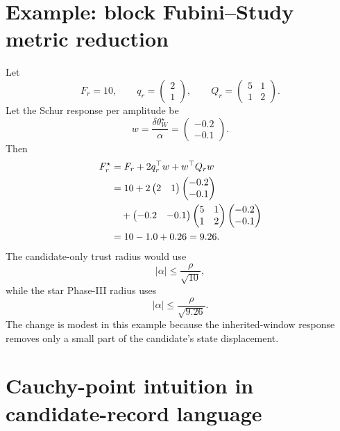 \documentclass[10pt,twocolumn]{article}
\newcommand{\twovec}[2]{\begin{pmatrix}#1\\#2\end{pmatrix}}
\begin{document}
\section{Example: block Fubini--Study metric reduction}

Let
\begin{equation}
F_r=10,\qquad
q_r=\twovec{2}{1},
\qquad
Q_r=
\begin{pmatrix}
5&1\\
1&2
\end{pmatrix}.
\label{eq:block_metric_ex_data}
\end{equation}
Let the Schur response per amplitude be
\begin{equation}
w=\frac{\delta\theta_W^\star}{\alpha}
=\twovec{-0.2}{-0.1}.
\label{eq:block_metric_w}
\end{equation}
Then
\begin{align}
F_r^\star
&=F_r+2q_r^\top w+w^\top Q_rw
\notag\\
&=10+2
\begin{pmatrix}2&1\end{pmatrix}
\twovec{-0.2}{-0.1}
\notag\\
&\quad
+
\begin{pmatrix}-0.2&-0.1\end{pmatrix}
\begin{pmatrix}
5&1\\
1&2
\end{pmatrix}
\twovec{-0.2}{-0.1}
\notag\\
&=10-1.0+0.26
=9.26.
\label{eq:block_metric_Fstar_ex}
\end{align}
The candidate-only trust radius would use
\begin{equation}
|\alpha|\le\frac{\rho}{\sqrt{10}},
\label{eq:block_metric_raw_bound}
\end{equation}
while the star Phase-III radius uses
\begin{equation}
|\alpha|\le\frac{\rho}{\sqrt{9.26}}.
\label{eq:block_metric_star_bound}
\end{equation}
The change is modest in this example because the inherited-window response removes only a small part of the candidate's state displacement.

\section{Cauchy-point intuition in candidate-record language}
\end{document}
